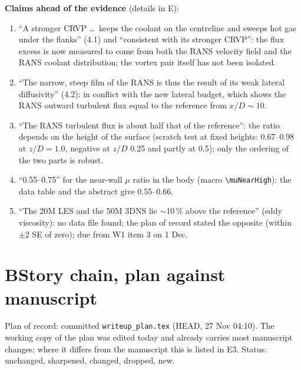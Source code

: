 \documentclass[10pt]{article}
\newcommand{\st}[1]{\textsf{\small #1}}
\begin{document}
\textbf{Claims ahead of the evidence} (details in E):
\begin{enumerate}[label=\arabic*.]
\item ``A stronger CRVP \dots\ keeps the coolant on the centreline and sweeps hot gas under the flanks'' (4.1) and
  ``consistent with its stronger CRVP'': the flux excess is now measured to come from both the RANS velocity field
  and the RANS coolant distribution; the vortex pair itself has not been isolated.
\item ``The narrow, steep film of the RANS is thus the result of its weak lateral diffusivity'' (4.2): in conflict
  with the new lateral budget, which shows the RANS outward turbulent flux equal to the reference from $x/D\sim10$.
\item ``The RANS turbulent flux is about half that of the reference'': the ratio depends on the height of the
  surface (scratch test at fixed heights: 0.67--0.98 at $z/D=1.0$, negative at $z/D$ 0.25 and partly at 0.5); only
  the ordering of the two parts is robust.
\item ``0.55--0.75'' for the near-wall $\mu$ ratio in the body (macro \texttt{\textbackslash muNearHigh}): the data
  table and the abstract give 0.55--0.66.
\item ``The 20M LES and the 50M 3DNS lie $\sim$10\,\% above the reference'' (eddy viscosity): no data file found;
  the plan of record stated the opposite (within $\pm2$ SE of zero); due from W1 item 3 on 1 Dec.
\end{enumerate}

\newpage
\section*{B\quad Story chain, plan against manuscript}

Plan of record: committed \texttt{writeup\_plan.tex} (HEAD, 27 Nov 04:10). The working copy of the plan was
edited today and already carries most manuscript changes; where it differs from the manuscript this is listed in
E3. Status: \st{unchanged}, \st{sharpened}, \st{changed}, \st{dropped}, \st{new}.
\end{document}
